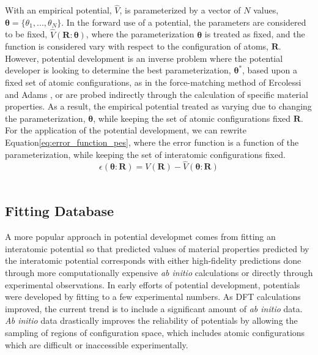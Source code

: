With an empirical potential, $\hat{V}$, is parameterized by a vector of $N$ values,
${\bm{\theta}=\{\theta_1,...,\theta_N\}}$.
In the forward use of a potential, the parameters are considered to be fixed, $\hat{V}(\bm{R}:\bm{\theta})$, where the parameterization $\bm{\theta}$ is treated as fixed, and the function is considered vary with respect to the configuration of atoms, $\bm{R}$.
However, potential development is an inverse problem where the potential developer is looking to determine the best parameterization, $\bm{\theta}^*$, based upon a fixed set of atomic configurations, as in the force-matching method of Ercolessi and Adams \cite{ercolessi1994_fitting_forcematching}
, or are probed indirectly through the calculation of specific material properties.
As a result, the empirical potential treated as varying due to changing the parameterization, $\bm{\theta}$, while keeping the set of atomic configurations fixed $\bm{R}$.  For the application of the potential development, we can rewrite Equation\ref{eq:error_function_pes}, where the error function is a function of the parameterization, while keeping the set of interatomic configurations fixed.
\begin{equation}
	\epsilon(\bm{\theta}:\bm{R})=V(\bm{R})-\hat{V}(\bm{\theta}:\bm{R})
\end{equation}
\\

\subsection{Fitting Database}
A more popular approach in potential developmet comes from fitting an interatomic potential so that predicted values of material properties predicted by the interatomic potential corresponds with either high-fidelity predictions done through more computationally expensive \emph{ab initio} calculations or directly through experimental observations.
In early efforts of potential development, potentials were developed by fitting to a few experimental numbers.
As DFT calculations improved, the current trend is to include a significant amount of \emph{ab initio} data.  \emph{Ab initio} data drastically improves the reliability of potentials by allowing the sampling of regions of configuration space, which includes atomic configurations which are difficult or inaccessible experimentally.



